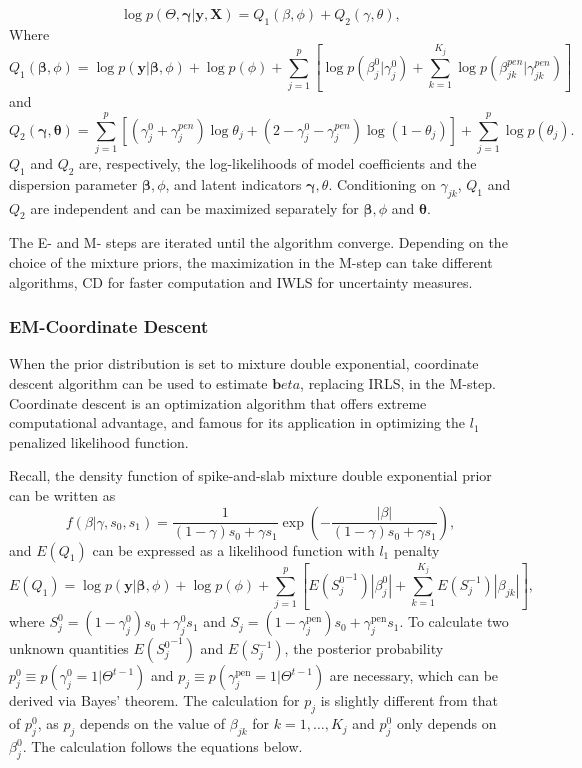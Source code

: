 \documentclass[AMA,STIX1COL,]{WileyNJD-v2}
\begin{document}
\[ \log p(\Theta, \boldsymbol{\gamma}| \textbf{y}, \textbf{X}) = Q_1(\beta, \phi) + Q_2 (\gamma,\theta),\]
Where
\[ Q_1(\boldsymbol{\beta}, \phi) = \log p(\textbf{y}|\boldsymbol{\beta}, \phi) + \log p(\phi) + \sum\limits_{j=1}^p\left[\log p(\beta^0_j|\gamma^0_j)+\sum\limits_{k=1}^{K_j} \log p(\beta^{pen}_{jk}|\gamma^{pen}_{jk})\right]\]
and \[
Q_2(\boldsymbol{\gamma},\boldsymbol{\theta}) = \sum\limits_{j=1}^{p} \left[ (\gamma^0_j+\gamma_{j}^{pen})\log \theta_j + (2-\gamma^0_j-\gamma_{j}^{pen}) \log (1-\theta_j)\right] +  \sum\limits_{j=1}^{p}\log p(\theta_j) .\]
\(Q_1\) and \(Q_2\) are, respectively, the log-likelihoods of model
coefficients and the dispersion parameter \(\boldsymbol{\beta}, \phi\),
and latent indicators \(\boldsymbol{\gamma}, \theta\). Conditioning on
\(\gamma_{jk}\), \(Q_1\) and \(Q_2\) are independent and can be
maximized separately for \(\boldsymbol{\beta}, \phi\) and
\(\boldsymbol{\theta}\).

The E- and M- steps are iterated until the algorithm converge. Depending
on the choice of the mixture priors, the maximization in the M-step can
take different algorithms, CD for faster computation and IWLS for
uncertainty measures.

\hypertarget{em-coordinate-descent}{%
\subsubsection{EM-Coordinate Descent}\label{em-coordinate-descent}}

When the prior distribution is set to mixture double exponential,
coordinate descent algorithm can be used to estimate
\(\boldsymbol{b}eta\), replacing IRLS, in the M-step. Coordinate descent
is an optimization algorithm that offers extreme computational
advantage, and famous for its application in optimizing the \(l_1\)
penalized likelihood function.

Recall, the density function of spike-and-slab mixture double
exponential prior can be written as \[
f(\beta|\gamma, s_0, s_1) = \frac{1}{(1-\gamma)s_0 + \gamma s_1}\exp(-\frac{|\beta|}{(1-\gamma)s_0 + \gamma s_1}),
\] and \(E(Q_1)\) can be expressed as a likelihood function with \(l_1\)
penalty \begin{equation}\label{eq:Q1_CD}
E(Q_1) = \log p(\textbf{y}|\boldsymbol{\beta}, \phi) + \log p(\phi) + \sum\limits_{j=1}^p\left[E({S^0_j}^{-1})|\beta^0_j|+\sum\limits_{k=1}^{K_j}E(S^{-1}_{j})|\beta_{jk}|\right],
\end{equation} where
\(S_{j}^0 = (1-\gamma^{0}_{j}) s_0 + \gamma^{0}_{j} s_1\) and
\(S_{j} = (1-\gamma^\text{pen}_{j}) s_0 + \gamma^\text{pen}_{j} s_1\).
To calculate two unknown quantities \(E({S_j^0}^{-1})\) and
\(E(S^{-1}_j)\), the posterior probability
\(p^0_{j} \equiv p(\gamma^{0}_{j}=1|\Theta^{t-1})\) and
\(p_{j} \equiv p(\gamma^\text{pen}_{j}=1|\Theta^{t-1})\) are necessary,
which can be derived via Bayes' theorem. The calculation for \(p_j\) is
slightly different from that of \(p^0_j\), as \(p_j\) depends on the
value of \(\beta_{jk}\) for \(k=1, \dots, K_j\) and \(p^0_j\) only
depends on \(\beta_j^0\). The calculation follows the equations below.
\end{document}
